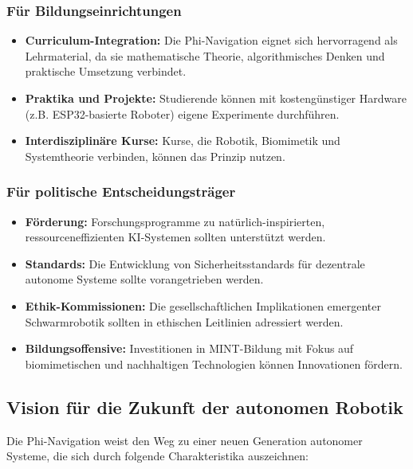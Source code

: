 ﻿\documentclass[a4paper,12pt]{article}
\theoremstyle{definition}
\begin{document}
\subsubsection{Für Bildungseinrichtungen}

\begin{itemize}
	\item \textbf{Curriculum-Integration:} Die Phi-Navigation eignet sich hervorragend als Lehrmaterial, da sie mathematische Theorie, algorithmisches Denken und praktische Umsetzung verbindet.
	
	\item \textbf{Praktika und Projekte:} Studierende können mit kostengünstiger Hardware (z.B. ESP32-basierte Roboter) eigene Experimente durchführen.
	
	\item \textbf{Interdisziplinäre Kurse:} Kurse, die Robotik, Biomimetik und Systemtheorie verbinden, können das Prinzip nutzen.
\end{itemize}

\subsubsection{Für politische Entscheidungsträger}

\begin{itemize}
	\item \textbf{Förderung:} Forschungsprogramme zu natürlich-inspirierten, ressourceneffizienten KI-Systemen sollten unterstützt werden.
	
	\item \textbf{Standards:} Die Entwicklung von Sicherheitsstandards für dezentrale autonome Systeme sollte vorangetrieben werden.
	
	\item \textbf{Ethik-Kommissionen:} Die gesellschaftlichen Implikationen emergenter Schwarmrobotik sollten in ethischen Leitlinien adressiert werden.
	
	\item \textbf{Bildungsoffensive:} Investitionen in MINT-Bildung mit Fokus auf biomimetischen und nachhaltigen Technologien können Innovationen fördern.
\end{itemize}

\subsection{Vision für die Zukunft der autonomen Robotik}

Die Phi-Navigation weist den Weg zu einer neuen Generation autonomer Systeme, die sich durch folgende Charakteristika auszeichnen:
\end{document}
